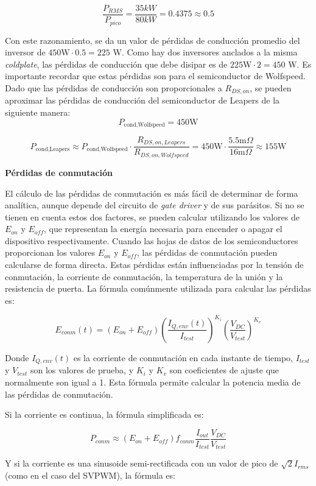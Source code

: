 \[
\frac{P_{RMS}}{P_{pico}} = \frac{35 kW}{80 kW} = 0.4375 \approx 0.5
\]

Con este razonamiento, se da un valor de pérdidas de conducción promedio del inversor de $450 \text{W} \cdot 0.5 = 225$ W. Como hay dos inversores anclados a la misma \textit{coldplate}, las pérdidas de conducción que debe disipar es de $225 \text{W} \cdot 2 = 450$ W. Es importante recordar que estas pérdidas son para el semiconductor de Wolfspeed. Dado que las pérdidas de conducción son proporcionales a $R_{DS, on}$, se pueden aproximar las pérdidas de conducción del semiconductor de Leapers de la siguiente manera:
\[
P_{\text{cond,Wolfspeed}} = 450 \text{W}
\]

\[
P_{\text{cond,Leapers}} \approx P_{\text{cond,Wolfspeed}} \cdot \frac{R_{DS, on, Leapers}}{R_{DS, on, Wolfspeed}} = 450 \text{W} \cdot \frac{5.5 \text{m}\Omega}{16 \text{m}\Omega} \approx 155 \text{W}
\]


\textbf{Pérdidas de conmutación}

El cálculo de las pérdidas de conmutación es más fácil de determinar de forma analítica, aunque depende del circuito de \textit{gate driver} y de sus parásitos. Si no se tienen en cuenta estos dos factores, se pueden calcular utilizando los valores de \(E_{on}\) y \(E_{off}\), que representan la energía necesaria para encender o apagar el dispositivo respectivamente. Cuando las hojas de datos de los semiconductores proporcionan los valores \(E_{on}\) y \(E_{off}\), las pérdidas de conmutación pueden calcularse de forma directa. Estas pérdidas están influenciadas por la tensión de conmutación, la corriente de conmutación, la temperatura de la unión y la resistencia de puerta. La fórmula comúnmente utilizada para calcular las pérdidas es:

\[
E_{conm}(t) = (E_{on} + E_{off}) \left( \frac{I_{Q,env}(t)}{I_{test}} \right)^{K_i} \left( \frac{V_{DC}}{V_{test}} \right)^{K_v}
\]

Donde \(I_{Q,env}(t)\) es la corriente de conmutación en cada instante de tiempo, \(I_{test}\) y \(V_{test}\) son los valores de prueba, y \(K_i\) y \(K_v\) son coeficientes de ajuste que normalmente son igual a 1. Esta fórmula permite calcular la potencia media de las pérdidas de conmutación.

Si la corriente es continua, la fórmula simplificada es:

\[
P_{conm} \approx (E_{on} + E_{off}) f_{conm} \frac{I_{out}}{I_{test}} \frac{V_{DC}}{V_{test}}
\]

Y si la corriente es una sinusoide semi-rectificada con un valor de pico de \(\sqrt{2} I_{rms}\) (como en el caso del SVPWM), la fórmula es:


